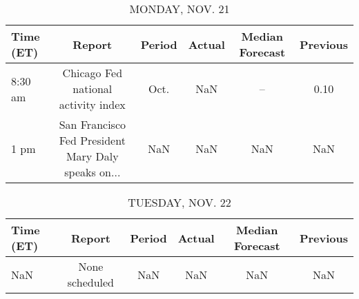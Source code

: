 \documentclass{article}%
\begin{document}
%
\normalsize%


\begin{table}[htbp]%
\caption{MONDAY, NOV. 21}%
\centering%
\begin{adjustbox}{width=1\textwidth}%
\begin{tabular}{lccccc}
\toprule
Time (ET) &                                             Report & Period & Actual & Median Forecast & Previous \\
\midrule
  8:30 am &                Chicago Fed national activity index &   Oct. &    NaN &              -- &     0.10 \\
     1 pm & San Francisco Fed President Mary Daly speaks on... &    NaN &    NaN &             NaN &      NaN \\
\bottomrule
\end{tabular}
%
\end{adjustbox}%
\end{table}

%


\begin{table}[htbp]%
\caption{TUESDAY, NOV. 22}%
\centering%
\begin{adjustbox}{width=1\textwidth}%
\begin{tabular}{lccccc}
\toprule
Time (ET) &         Report & Period & Actual & Median Forecast & Previous \\
\midrule
      NaN & None scheduled &    NaN &    NaN &             NaN &      NaN \\
\bottomrule
\end{tabular}
%
\end{adjustbox}%
\end{table}

%
\end{document}
